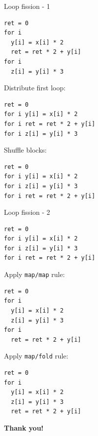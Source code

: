 \documentclass[handout]{beamer}
\begin{document}
\begin{frame}[fragile]{Loop fission - 1}

\vspace{-1ex}

\begin{lstlisting}
ret = 0
for i
  y[i] = x[i] * 2
  ret = ret * 2 + y[i]
for i
  z[i] = y[i] * 3
\end{lstlisting}

Distribute first loop:

\begin{lstlisting}
ret = 0
for i y[i] = x[i] * 2
for i ret = ret * 2 + y[i]
for i z[i] = y[i] * 3
\end{lstlisting}

Shuffle blocks:

\begin{lstlisting}
ret = 0
for i y[i] = x[i] * 2
for i z[i] = y[i] * 3
for i ret = ret * 2 + y[i]
\end{lstlisting}

\end{frame}

\begin{frame}[fragile]{Loop fission - 2}

\vspace{-1ex}

\begin{lstlisting}
ret = 0
for i y[i] = x[i] * 2
for i z[i] = y[i] * 3
for i ret = ret * 2 + y[i]
\end{lstlisting}

Apply {\tt map/map} rule:

\begin{lstlisting}
ret = 0
for i
  y[i] = x[i] * 2
  z[i] = y[i] * 3
for i
  ret = ret * 2 + y[i]
\end{lstlisting}

Apply {\tt map/fold} rule:

\begin{lstlisting}
ret = 0
for i
  y[i] = x[i] * 2
  z[i] = y[i] * 3
  ret = ret * 2 + y[i]
\end{lstlisting}

\end{frame}

\begin{frame}
\centerline{\Huge\bf Thank you!}
\end{frame}
\end{document}
